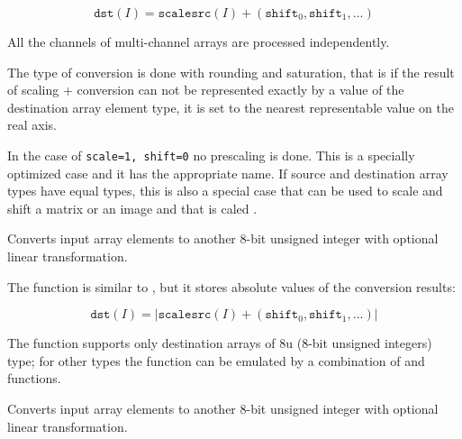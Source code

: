 \[
\texttt{dst}(I) = \texttt{scale} \texttt{src}(I) + (\texttt{shift}_0,\texttt{shift}_1,...)
\]

All the channels of multi-channel arrays are processed independently.

The type of conversion is done with rounding and saturation, that is if the
result of scaling + conversion can not be represented exactly by a value
of the destination array element type, it is set to the nearest representable
value on the real axis.

In the case of \texttt{scale=1, shift=0} no prescaling is done. This is a specially
optimized case and it has the appropriate  name. If
source and destination array types have equal types, this is also a
special case that can be used to scale and shift a matrix or an image
and that is caled .


Converts input array elements to another 8-bit unsigned integer with optional linear transformation.


\begin{description}
\end{description}

The function is similar to , but it stores absolute values of the conversion results:

\[
\texttt{dst}(I) = |\texttt{scale} \texttt{src}(I) + (\texttt{shift}_0,\texttt{shift}_1,...)|
\]

The function supports only destination arrays of 8u (8-bit unsigned integers) type; for other types the function can be emulated by a combination of  and  functions.

Converts input array elements to another 8-bit unsigned integer with optional linear transformation.


\begin{description}
\end{description}



